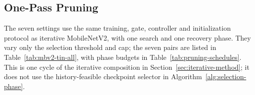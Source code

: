 \subsection{One-Pass Pruning}
\label{sec:mbv2-one-shot-implementation}
The seven settings use the same training, gate, controller and
initialization protocol as iterative MobileNetV2, with one search
and one recovery phase. They vary only the selection threshold and cap;
the seven pairs are listed in Table~\ref{tab:mbv2-tin-all}, with phase
budgets in Table~\ref{tab:pruning-schedules}.
This is one cycle of the iterative composition in Section~\ref{sec:iterative-method}; it does not
use the history-feasible checkpoint selector in Algorithm~\ref{alg:selection-phase}.

